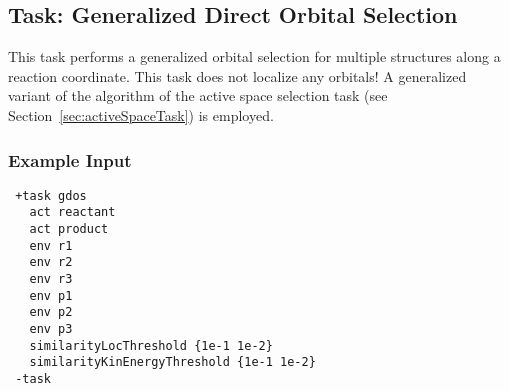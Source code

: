 \subsection{Task: Generalized Direct Orbital Selection\label{task:gdos}}
This task performs a generalized orbital selection for multiple structures along a reaction coordinate.
This task does not localize any orbitals! A generalized variant of the algorithm of
the active space selection task (see Section~\ref{sec:activeSpaceTask}) is employed.
\subsubsection{Example Input}
\begin{lstlisting}
 +task gdos
   act reactant
   act product
   env r1
   env r2
   env r3
   env p1
   env p2
   env p3
   similarityLocThreshold {1e-1 1e-2}
   similarityKinEnergyThreshold {1e-1 1e-2}
 -task
\end{lstlisting}
